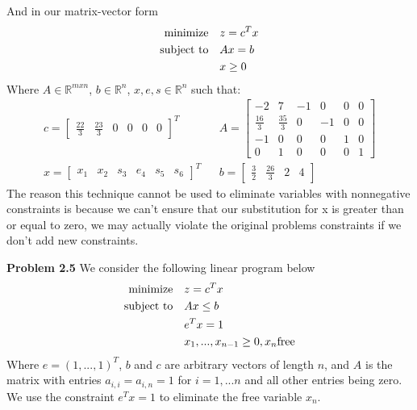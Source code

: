 \documentclass{article}
\begin{document}
And in our matrix-vector form
\begin{align*}
    \text{minimize} &\null \quad z = c^Tx \\
    \text{subject to} &\null \quad Ax=b \\
    & \quad x \geq 0
\end{align*}
Where $A \in \mathbb{R}^{mxn}$, $b \in \mathbb{R}^n$, $x, e, s \in \mathbb{R}^n$ such that:  
\begin{align*}c =
    \begin{bmatrix}
        \frac{22}{3} & \frac{23}{3} & 0 & 0 & 0 & 0
    \end{bmatrix}^T && A =
    \begin{bmatrix}
        -2 & 7 & -1 & 0 & 0 & 0 \\
        \frac{16}{3} & \frac{35}{3} & 0 & -1 & 0 & 0 \\
        -1 & 0 & 0 & 0 & 1 & 0 \\
        0 & 1 & 0 & 0 & 0 & 1
    \end{bmatrix} \\ x =
    \begin{bmatrix}
        x_1 & x_2 & s_3 & e_4 & s_5 & s_6
    \end{bmatrix}^T && b =
    \begin{bmatrix}
        \frac{3}{2} & \frac{26}{3} & 2 & 4
    \end{bmatrix}
\end{align*}
The reason this technique cannot be used to eliminate variables with nonnegative constraints is because we can't ensure that our substitution for x is greater than or equal to zero, we may actually violate the original problems constraints if we don't add new constraints.

\textbf{Problem 2.5} We consider the following linear program below
\begin{align*}
    \text{minimize} &\null \quad z = c^Tx \\
    \text{subject to} &\null \quad Ax \leq b \\
    & \quad e^Tx = 1 \\
    & \quad x_1, ..., x_{n-1} \geq 0, x_n \text{free}
\end{align*}
Where $e = (1,...,1)^T$, $b$ and $c$ are arbitrary vectors of length $n$, and $A$ is the matrix with entries $a_{i,i} = a_{i,n} = 1$ for $i = 1,...n$ and all other entries being zero. We use the constraint $e^Tx = 1$ to eliminate the free variable $x_n$.
\end{document}
